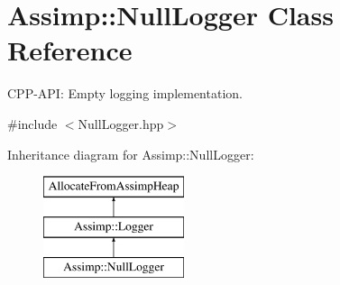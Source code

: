 \hypertarget{class_assimp_1_1_null_logger}{\section{Assimp\-:\-:Null\-Logger Class Reference}
\label{class_assimp_1_1_null_logger}
}


C\-P\-P-\/\-A\-P\-I\-: Empty logging implementation.  




{\ttfamily \#include $<$Null\-Logger.\-hpp$>$}

Inheritance diagram for Assimp\-:\-:Null\-Logger\-:\begin{figure}[H]
\begin{center}
\leavevmode
\includegraphics[height=3.000000cm]{class_assimp_1_1_null_logger}
\end{center}
\end{figure}
